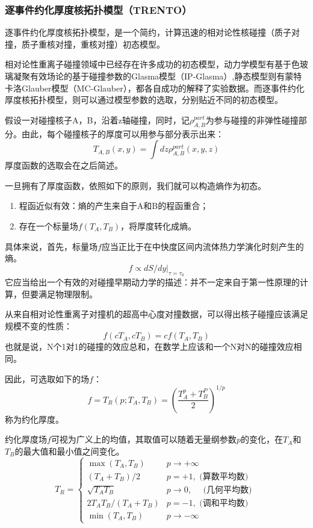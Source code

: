 \documentclass[aps,pre,12pt,preprint,onecolumn,showpacs,showkeys]{revtex4-1}
\begin{document}
\subsubsection{逐事件约化厚度核拓扑模型（TRENTO）}
逐事件约化厚度核拓扑模型，是一个简约，计算迅速的相对论性核碰撞（质子对撞，质子重核对撞，重核对撞）初态模型。
\par
相对论性重离子碰撞领域中已经存在许多成功的初态模型，动力学模型有基于色玻璃凝聚有效场论的基于碰撞参数的Glasma模型（IP-Glasma）,静态模型则有蒙特卡洛Glauber模型（MC-Glauber），都各自成功的解释了实验数据。而逐事件约化厚度核拓扑模型，则可以通过模型参数的选取，分别贴近不同的初态模型。
\par
假设一对碰撞核子A，B，沿着z轴碰撞，同时，记$\rho_{A,B}^{part}$为参与碰撞的非弹性碰撞部分。由此，每个碰撞核子的厚度可以用参与部分表示出来：
\begin{equation}
    T_{A,B}(x,y)=\int dz \rho_{A,B}^{part}(x,y,z)
\end{equation}
厚度函数的选取会在之后简述。\par
一旦拥有了厚度函数，依照如下的原则，我们就可以构造熵作为初态。
\begin{enumerate}
    \item 程函近似有效：熵的产生来自于A和B的程函重合；
    \item 存在一个标量场$f(T_A,T_B)$，将厚度转化成熵。
\end{enumerate}
具体来说，首先，标量场$f$应当正比于在中快度区间内流体热力学演化时刻产生的熵。
\begin{equation}
    f\propto dS/dy|_{\tau=\tau_0}
\end{equation}
它应当给出一个有效的对碰撞早期动力学的描述：并不一定来自于第一性原理的计算，但要满足物理限制。
\par
从来自相对论性重离子对撞机的超高中心度对撞数据，可以得出核子碰撞应该满足规模不变的性质：
\begin{equation}
    f(cT_A,cT_B)=cf(T_A,T_B)
\end{equation}
也就是说，N个1对1的碰撞的效应总和，在数学上应该和一个N对N的碰撞效应相同。\par
因此，可选取如下的场$f$：
\begin{equation}
    f=T_R(p;T_A,T_B)=(\frac{T^p_A+T^P_B}{2})^{1/p}
\end{equation}
称为约化厚度。\par
约化厚度场$f$可视为广义上的均值，其取值可以随着无量纲参数$p$的变化，在$T_A$和$T_B$的最大值和最小值之间变化。
\begin{equation}
T_{R}=\left\{\begin{array}{ll}{\max \left(T_{A}, T_{B}\right)} & {p \rightarrow+\infty} \\ 
{\left(T_{A}+T_{B}\right) / 2} & {p=+1, \text { (算数平均数) }} \\ 
{\sqrt{T_{A} T_{B}}} & {p\to0, \quad \text { (几何平均数) }} \\ 
{2 T_{A} T_{B} /\left(T_{A}+T_{B}\right)} & {p=-1, \text { (调和平均数) }} \\ 
{\min \left(T_{A}, T_{B}\right)} & {p \rightarrow-\infty}\end{array}\right.
\end{equation}
\end{document}
